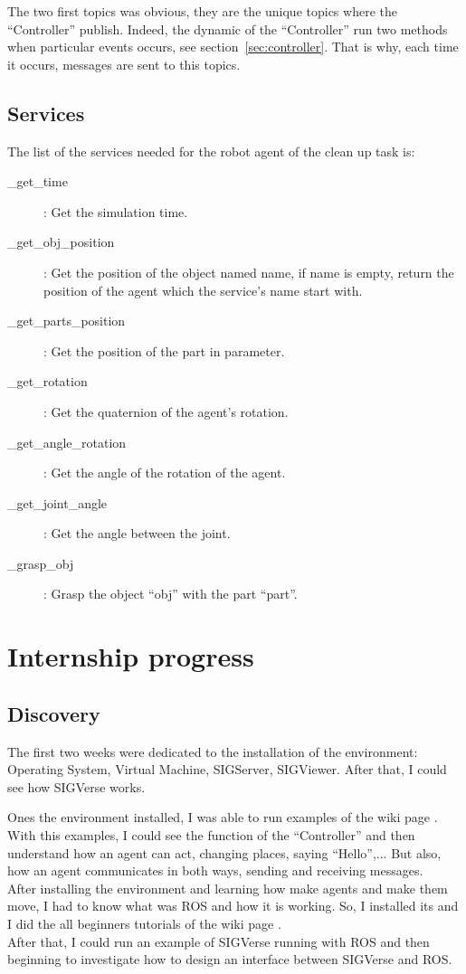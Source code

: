 The two first topics was obvious, they are the unique topics where the ``Controller'' publish. Indeed, the dynamic of the ``Controller'' run two methods when particular events occurs, see section~\ref{sec:controller}. That is why, each time it occurs, messages are sent to this topics.


\subsection{Services}
The list of the services needed for the robot agent of the clean up task is:
\begin{description}
	\item[\_get\_time] : Get the simulation time.
	\item[\_get\_obj\_position] : Get the position of the object named name, if name is empty, return the position of the agent which the service's name start with.
	\item[\_get\_parts\_position] : Get the position of the part in parameter.
	\item[\_get\_rotation] : Get the quaternion of the agent's rotation.
	\item[\_get\_angle\_rotation] : Get the angle of the rotation of the agent.
	\item[\_get\_joint\_angle]: Get the angle between the joint.
	\item[\_grasp\_obj]: Grasp the object ``obj'' with the part ``part''.
\end{description}

\section{Internship progress}
\subsection{Discovery}
The first two weeks were dedicated to the installation of the environment: Operating System, Virtual Machine, SIGServer, SIGViewer. After that, I could see how SIGVerse works. 

Ones the environment installed, I was able to run examples of the wiki page \cite{SIGVerseWiki}. With this examples, I could see the function of the ``Controller'' and then understand how an agent can act, changing places, saying ``Hello'',... But also, how an agent communicates in both ways, sending and receiving messages.\\

After installing the environment and learning how make agents and make them move, I had to know what was ROS and how it is working. So, I installed its and I did the all beginners tutorials of the wiki page \cite{ROSWiki}.\\
After that, I could run an example of SIGVerse running with ROS and then beginning to investigate how to design an interface between SIGVerse and ROS.

